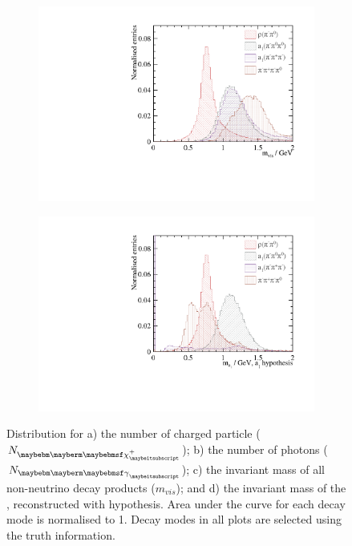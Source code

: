 \begin{figure}[htbp]
\begin{subfigure}[b]{0.45\textwidth}
 \includegraphics[width=\textwidth]{tau/var2/mVis_100GeV_improved_zoom.pdf}
  \caption{}
  \label{fig:tauVarMVis}
\end{subfigure}
\begin{subfigure}[b]{0.45\textwidth}
 \includegraphics[width=\textwidth]{tau/var2/mA1A1Fit_100GeV_improved_zoom.pdf}
  \caption{}
  \label{fig:tauVarMA1}
\end{subfigure}

\caption
{Distribution for a) the number of charged particle (${N}_{\charge}$); b) the number of photons (${N}_{\Pgg}$); c) the invariant mass of all non-neutrino decay products ($m_{vis}$); and d) the invariant mass of the \Pai, reconstructed with \decayAiPhotonShort hypothesis. Area under the curve for each decay mode is normalised to 1. Decay modes in all plots are selected using the truth information.}
\label{fig:tauVar}
\end{figure}

